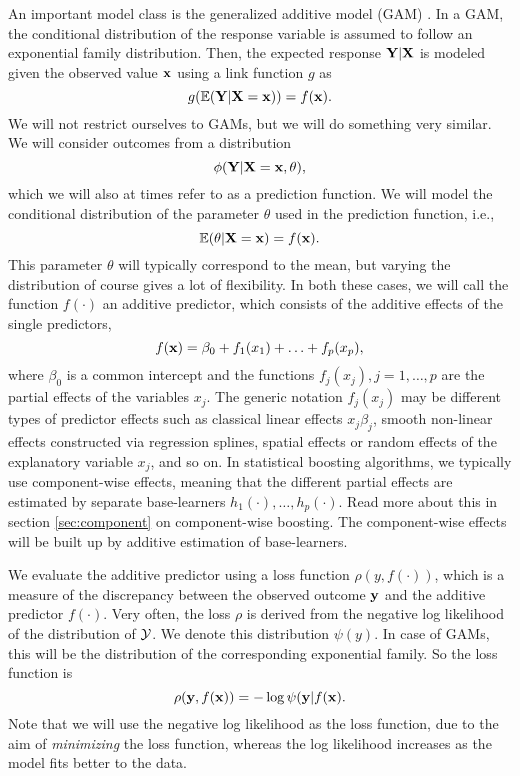 An important model class is the generalized additive model (GAM) \citep{gam-book}. In a GAM, the conditional distribution of the response variable is assumed to follow an exponential family distribution. Then, the expected response $\mathbf{Y}|\mathbf{X}$ is modeled given the observed value $\mathbf{x}$ using a link function $g$ as
\begin{equation}
    g(\mathbb{E}(\mathbf{Y}|\mathbf{X}=\mathbf{x}))=f(\mathbf{x}).
\end{equation}
We will not restrict ourselves to GAMs, but we will do something very similar. We will consider outcomes from a distribution
\begin{equation}
    \phi(\mathbf{Y}|\mathbf{X}=\mathbf{x},\theta),
\end{equation}
which we will also at times refer to as a prediction function. We will model the conditional distribution of the parameter $\theta$ used in the prediction function, i.e.,
\begin{equation}
    \mathbb{E}(\theta|\mathbf{X}=\mathbf{x})=f(\mathbf{x}).
\end{equation}
This parameter $\theta$ will typically correspond to the mean, but varying the distribution of course gives a lot of flexibility. In both these cases, we will call the function $f(\cdot)$ an additive predictor, which consists of the additive effects of the single predictors,
\begin{equation}\label{eq:gam}
    f(\mathbf{x})=\beta_0+f_1(x_1)+\ldots+f_p(x_p),
\end{equation}
where $\beta_0$ is a common intercept and the functions $f_j(x_j),j=1,\ldots,p$ are the partial effects of the variables $x_j$. The generic notation $f_j(x_j)$ may be different types of predictor effects such as classical linear effects $x_j\beta_j$, smooth non-linear effects constructed via regression splines, spatial effects or random effects of the explanatory variable $x_j$, and so on. In statistical boosting algorithms, we typically use component-wise effects, meaning that the different partial effects are estimated by separate base-learners $h_1(\cdot),\ldots,h_p(\cdot)$. Read more about this in section \ref{sec:component} on component-wise boosting. The component-wise effects will be built up by additive estimation of base-learners.

We evaluate the additive predictor using a loss function $\rho(y,f(\cdot))$, which is a measure of the discrepancy between the observed outcome $\mathbf{y}$ and the additive predictor $f(\cdot)$. Very often, the loss $\rho$ is derived from the negative log likelihood of the distribution of $\mathcal{Y}$. We denote this distribution $\psi(y)$. In case of GAMs, this will be the distribution of the corresponding exponential family. So the loss function is
\begin{equation}
    \rho(\mathbf{y},f(\mathbf{x}))=-\log{\psi(\mathbf{y}|f(\mathbf{x})}.
\end{equation}
Note that we will use the negative log likelihood as the loss function, due to the aim of \textit{minimizing} the loss function, whereas the log likelihood increases as the model fits better to the data.


